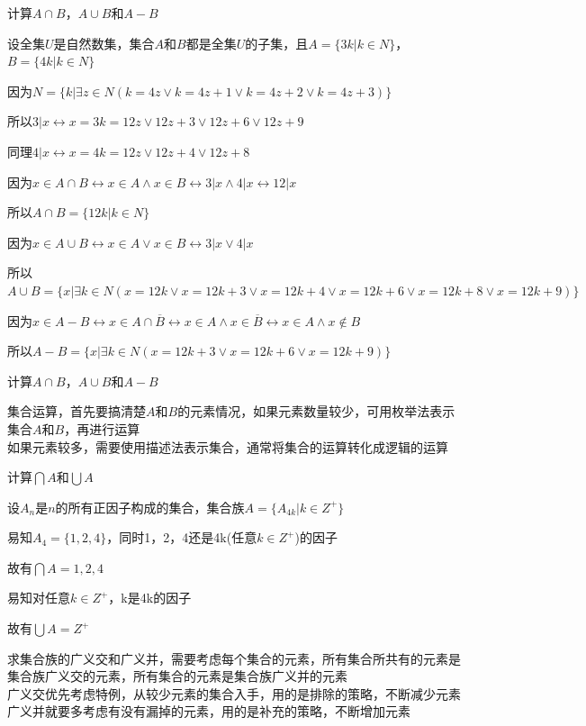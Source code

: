 \documentclass[xetex,10pt,aspectratio=43]{beamer}
\begin{document}
	\begin{frame}{计算$A\cap B$，$A\cup B$和$A−B$}
		
	设全集$U$是自然数集，集合$A$和$B$都是全集$U$的子集，且$A=\{3k|k\in N\}$，$B=\{4k|k\in N\}$
	
	因为$N=\{k|\exists z\in N(k=4z\vee k=4z+1\vee k=4z+2\vee k=4z+3)\}$
	
	所以$3|x\leftrightarrow x=3k=12z\vee 12z+3\vee 12z+6\vee 12z+9$
	
	同理$4|x\leftrightarrow x=4k=12z\vee 12z+4\vee 12z+8$
	
	因为$x\in A\cap B\leftrightarrow x\in A\wedge x\in B\leftrightarrow 3|x\wedge 4|x\leftrightarrow 12|x$
	
	所以$A\cap B=\{12k|k\in N\}$
	
	因为$x\in A\cup B\leftrightarrow x\in A\vee x\in B\leftrightarrow 3|x\vee 4|x$
	
	所以$A\cup B=\{x|\exists k\in N(x=12k\vee x=12k+3\vee x=12k+4\vee x=12k+6\vee x=12k+8\vee x=12k+9)\}$
	
	因为$x\in A-B\leftrightarrow x\in A\cap\overline{B}\leftrightarrow x\in A\wedge x\in\overline{B}\leftrightarrow x\in A\wedge x\notin B$

	所以$A-B=\{x|\exists k\in N(x=12k+3\vee x=12k+6\vee x=12k+9)\}$

	\end{frame}

	\begin{frame}{计算$A\cap B$，$A\cup B$和$A−B$}
		
		\textcolor{mymauve}{集合运算，首先要搞清楚$A$和$B$的元素情况，如果元素数量较少，可用枚举法表示集合$A$和$B$，再进行运算\\
		如果元素较多，需要使用描述法表示集合，通常将集合的运算转化成逻辑的运算}
	
	\end{frame}
	
	\begin{frame}{计算$\bigcap A$和$\bigcup A$}
		
	设$A_n$是$n$的所有正因子构成的集合，集合族$A=\{A_{4k}|k\in Z^{+}\}$
	
	易知$A_4=\{1,2,4\}$，同时1，2，4还是4k(任意$k\in Z^{+}$)的因子
	
	故有$\bigcap A={1,2,4}$	
	
	易知对任意$k\in Z^{+}$，k是4k的因子
	
	故有$\bigcup A=Z^{+}$

	\textcolor{mymauve}{求集合族的广义交和广义并，需要考虑每个集合的元素，所有集合所共有的元素是集合族广义交的元素，所有集合的元素是集合族广义并的元素\\
	广义交优先考虑特例，从较少元素的集合入手，用的是排除的策略，不断减少元素\\
	广义并就要多考虑有没有漏掉的元素，用的是补充的策略，不断增加元素}
		
	\end{frame}
	
\end{document}
